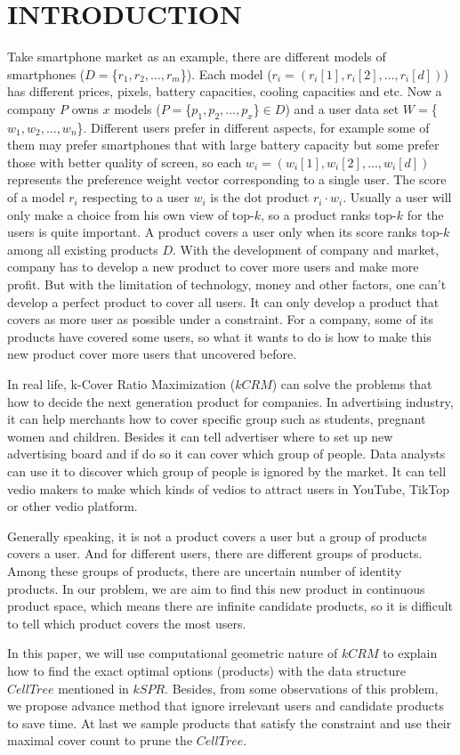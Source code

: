 \chapter{INTRODUCTION}
\label{chp:introduction}
Take smartphone market as an example, there are different models of smartphones 
($D=$\{$r_1, r_2, ..., {r_m}$\}). Each model ($r_i=(r_i[1], r_i[2], ..., r_i[d])$) 
has different prices, pixels, battery capacities, cooling capacities and etc. 
Now a company $P$ owns $x$ models ($P=$\{$p_1, p_2, ..., p_x$\}$\in D$) 
and a user data set $W=$\{$w_1, w_2, ..., w_n$\}. Different users prefer in 
different aspects, for example some of them may prefer smartphones that with 
large battery capacity but some prefer those with better quality of screen, so each 
$w_i=(w_i[1], w_i[2], ..., w_i[d])$ represents the preference weight vector corresponding 
to a single user. The score of a model $r_i$ respecting to a user $w_i$ is the 
dot product $r_i\cdot w_i$. Usually a user will only make a choice from his own 
view of top-$k$, so a product ranks top-$k$ for the users is quite important. 
A product covers a user only when its score ranks top-$k$ among all existing 
products $D$. With the development of company and market, company has to develop a new 
product to cover more users and make more profit. But with the limitation of technology, 
money and other factors, one can't develop a perfect product to cover all users. 
It can only develop a product that covers as more user as possible under a constraint. 
For a company, some of its products have covered some users, so what it wants to do 
is how to make this new product cover more users that uncovered before.

In real life, k-Cover Ratio Maximization ($kCRM$) can solve the problems that how to 
decide the next generation product for companies. In advertising industry, it can help 
merchants how to cover specific group such as students, pregnant women and children. 
Besides it can tell advertiser where to set up new advertising board and if do so it 
can cover which group of people. Data analysts can use it to discover which group of 
people is ignored by the market. It can tell vedio makers to make which kinds of vedios
to attract users in YouTube, TikTop or other vedio platform.

Generally speaking, it is not a product covers a user but a group of products covers 
a user. And for different users, there are different groups of products. Among these 
groups of products, there are uncertain number of identity products. In our problem, 
we are aim to find this new product in continuous product space, which means there are 
infinite candidate products, so it is difficult to tell which product covers the most 
users.

In this paper, we will use computational geometric nature of $kCRM$ to explain how to 
find the exact optimal options (products) with the data structure $CellTree$ mentioned 
in $kSPR$\cite{tang_mouratidis_yiu_2017}. Besides, from some observations of this problem, we propose advance 
method that ignore irrelevant users and candidate products to save time. At last 
we sample products that satisfy the constraint and use their maximal cover count to 
prune the $CellTree$.

